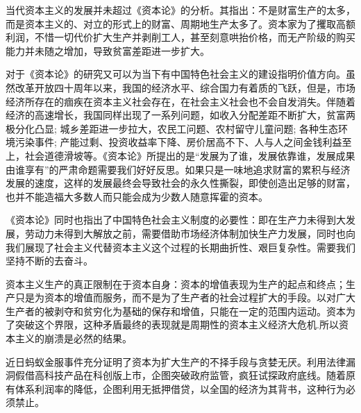 \documentclass[utf8]{ctexart}
\begin{document}
	当代资本主义的发展并未超过《资本论》的分析。其指出：不是财富生产的太多，而是资本主义的、对立的形式上的财富、周期地生产太多了。资本家为了攫取高额利润，不惜一切代价扩大生产并剥削工人，甚至刻意哄抬价格，而无产阶级的购买能力并未随之增加，导致贫富差距进一步扩大。
	
	
	对于《资本论》的研究又可以为当下有中国特色社会主义的建设指明价值方向。虽然改革开放四十周年以来，我国的经济水平、综合国力有着质的飞跃，但是，市场经济所存在的痼疾在资本主义社会存在，在社会主义社会也不会自发消失。伴随着经济的高速增长，我国同样出现了一系列问题，如收入分配差距不断扩大，贫富两极分化凸显; 城乡差距进一步拉大，农民工问题、农村留守儿童问题; 各种生态环境污染事件; 产能过剩、投资收益率下降、房价居高不下、人与人之间金钱利益至上，社会道德滑坡等。《资本论》所提出的是“发展为了谁，发展依靠谁，发展成果由谁享有”的严肃命题需要我们好好反思。如果只是一味地追求财富的累积与经济发展的速度，这样的发展最终会导致社会的永久性撕裂，即使创造出足够的财富，也并不能造福大多数人而只能会成为少数人随意挥霍的资本。
	
	《资本论》同时也指出了中国特色社会主义制度的必要性：即在生产力未得到大发展，劳动力未得到大解放之前，需要借助市场经济体制加快生产力发展，同时也向我们展现了社会主义代替资本主义这个过程的长期曲折性、艰巨复杂性。需要我们坚持不断的去奋斗。
	
	资本主义生产的真正限制在于资本自身：资本的增值表现为生产的起点和终点；生产只是为资本的增值而服务，而不是为了生产者的社会过程扩大的手段。以对广大生产者的被剥夺和贫穷化为基础的保存和增值，只能在一定的范围内运动。资本为了突破这个界限，这种矛盾最终的表现就是周期性的资本主义经济大危机.所以资本主义的崩溃是必然的结果。
	
	近日蚂蚁金服事件充分证明了资本为扩大生产的不择手段与贪婪无厌。利用法律漏洞假借高科技产品在科创版上市，企图突破政府监管，疯狂试探政府底线。随着原有体系利润率的降低，企图利用无抵押借贷，以全国的经济为其背书，这种行为必须禁止。
	
\end{document}
